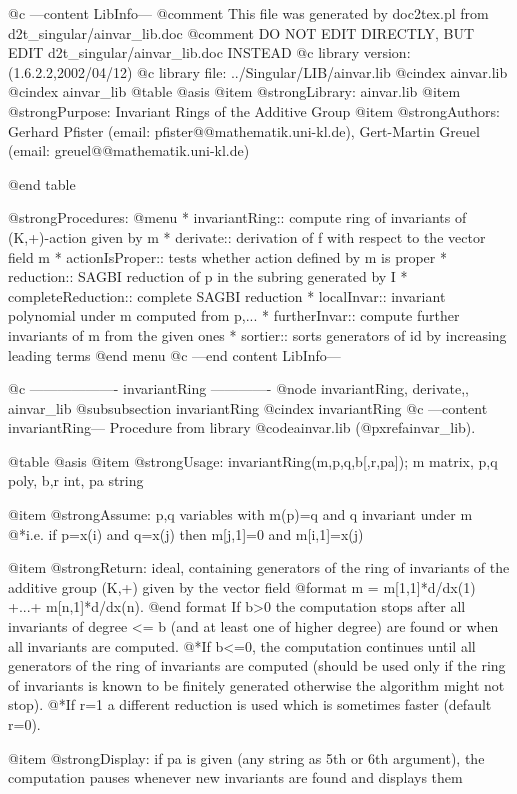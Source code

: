 @c ---content LibInfo---
@comment This file was generated by doc2tex.pl from d2t_singular/ainvar_lib.doc
@comment DO NOT EDIT DIRECTLY, BUT EDIT d2t_singular/ainvar_lib.doc INSTEAD
@c library version: (1.6.2.2,2002/04/12)
@c library file: ../Singular/LIB/ainvar.lib
@cindex ainvar.lib
@cindex ainvar_lib
@table @asis
@item @strong{Library:}
ainvar.lib
@item @strong{Purpose:}
    Invariant Rings of the Additive Group
@item @strong{Authors:}
Gerhard Pfister (email: pfister@@mathematik.uni-kl.de),
Gert-Martin Greuel (email: greuel@@mathematik.uni-kl.de)

@end table

@strong{Procedures:}
@menu
* invariantRing:: compute ring of invariants of (K,+)-action given by m
* derivate:: derivation of f with respect to the vector field m
* actionIsProper:: tests whether action defined by m is proper
* reduction:: SAGBI reduction of p in the subring generated by I
* completeReduction:: complete SAGBI reduction
* localInvar:: invariant polynomial under m computed from p,...
* furtherInvar:: compute further invariants of m from the given ones
* sortier:: sorts generators of id by increasing leading terms
@end menu
@c ---end content LibInfo---

@c ------------------- invariantRing -------------
@node invariantRing, derivate,, ainvar_lib
@subsubsection invariantRing
@cindex invariantRing
@c ---content invariantRing---
Procedure from library @code{ainvar.lib} (@pxref{ainvar_lib}).

@table @asis
@item @strong{Usage:}
invariantRing(m,p,q,b[,r,pa]); m matrix, p,q poly, b,r int, pa string

@item @strong{Assume:}
p,q variables with m(p)=q and q invariant under m
@*i.e. if p=x(i) and q=x(j) then m[j,1]=0 and m[i,1]=x(j)

@item @strong{Return:}
ideal, containing generators of the ring of invariants of the
additive group (K,+) given by the vector field
@format
         m = m[1,1]*d/dx(1) +...+ m[n,1]*d/dx(n).
@end format
If b>0 the computation stops after all invariants of degree <= b
(and at least one of higher degree) are found or when all invariants
are computed.
@*If b<=0, the computation continues until all generators
of the ring of invariants are computed (should be used only if the
ring of invariants is known to be finitely generated otherwise the
algorithm might not stop).
@*If r=1 a different reduction is used which is sometimes faster
(default r=0).

@item @strong{Display:}
if pa is given (any string as 5th or 6th argument), the computation
pauses whenever new invariants are found and displays them

